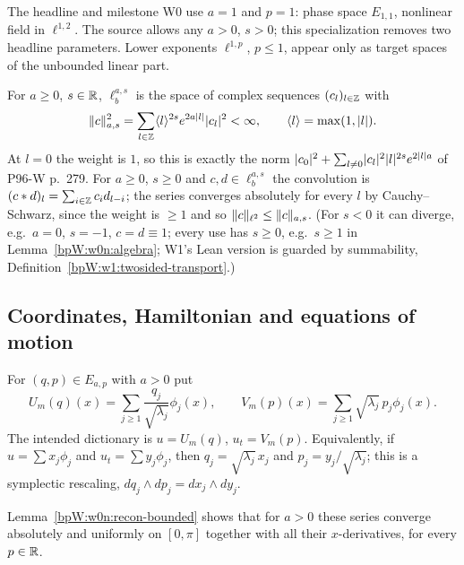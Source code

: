 \begin{convention}\label{bpW:w0:weights}
The headline and milestone W0 use $a=1$ and $p=1$: phase space $E_{1,1}$, nonlinear field in $\ell^{1,2}$. The source
allows any $a>0$, $s>0$; this specialization removes two headline parameters. Lower exponents $\ell^{1,p}$, $p\le1$,
appear only as target spaces of the unbounded linear part.
\end{convention}

\begin{definition}\label{bpW:w0:twosided}
For $a\ge0$, $s\in\mathbb{R}$, $\ell^{a,s}_b$ is the space of complex sequences $(c_l)_{l\in\mathbb{Z}}$ with
\[\lVert c\rVert_{a,s}^2=\sum_{l\in\mathbb{Z}}\langle l\rangle^{2s}e^{2a\lvert l\rvert}\lvert c_l\rvert^2<\infty,\qquad \langle l\rangle=\max(1,\lvert l\rvert).\]
At $l=0$ the weight is $1$, so this is exactly the norm $\lvert c_0\rvert^2+\sum_{l\ne0}\lvert c_l\rvert^2\lvert l\rvert^{2s}e^{2\lvert l\rvert a}$ of
P96-W p.~279. For $a\ge0$, $s\ge0$ and $c,d\in\ell^{a,s}_b$ the convolution is $(c*d)_l=\sum_{i\in\mathbb{Z}}c_id_{l-i}$;
the series converges absolutely for every $l$ by Cauchy--Schwarz, since the weight is $\ge1$ and so
$\lVert c\rVert_{\ell^2}\le\lVert c\rVert_{a,s}$. (For $s<0$ it can diverge, e.g.\ $a=0$, $s=-1$, $c=d\equiv1$; every use has
$s\ge0$, e.g.\ $s\ge1$ in Lemma~\ref{bpW:w0n:algebra}; W1's Lean version is guarded by summability,
Definition~\ref{bpW:w1:twosided-transport}.)
\end{definition}

\subsection{Coordinates, Hamiltonian and equations of motion}\label{bpW:w0:hamiltonian}

\begin{definition}[Reconstruction]\label{bpW:w0:reconstruction}
For $(q,p)\in E_{a,p}$ with $a>0$ put
\[U_m(q)(x)=\sum_{j\ge1}\frac{q_j}{\sqrt{\lambda_j}}\phi_j(x),\qquad V_m(p)(x)=\sum_{j\ge1}\sqrt{\lambda_j}\,p_j\phi_j(x).\]
The intended dictionary is $u=U_m(q)$, $u_t=V_m(p)$. Equivalently, if $u=\sum x_j\phi_j$ and $u_t=\sum y_j\phi_j$, then
$q_j=\sqrt{\lambda_j}\,x_j$ and $p_j=y_j/\sqrt{\lambda_j}$; this is a symplectic rescaling,
$dq_j\wedge dp_j=dx_j\wedge dy_j$.
\end{definition}

Lemma~\ref{bpW:w0n:recon-bounded} shows that for $a>0$ these series converge absolutely and uniformly on $[0,\pi]$
together with all their $x$-derivatives, for every $p\in\mathbb{R}$.

